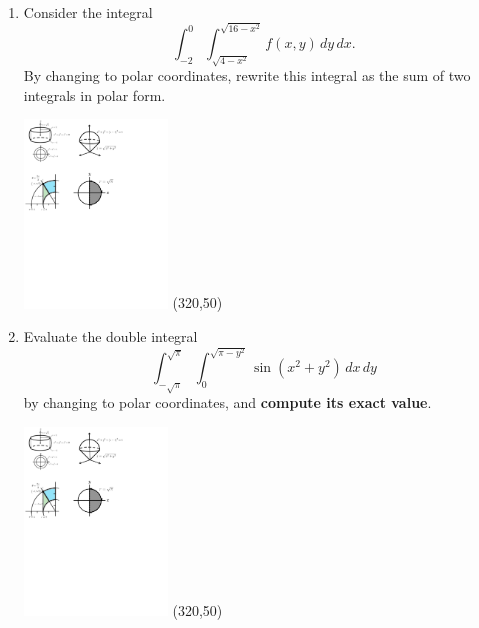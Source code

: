 \documentclass[12pt]{exam}
\begin{document}
\begin{enumerate} 

\item Consider the integral 
$$\int_{-2}^0\int_{\sqrt{4-x^2}}^{\sqrt{16-x^2}}f(x,y)\,dy\,dx.$$
By changing to polar coordinates, rewrite this integral as the sum of two integrals in polar form.
\begin{flushleft}
    \includegraphics[width=0.3\textwidth, trim=0.5cm 14.5cm 16.5cm 8cm,clip]{figs.pdf}\hfill 
\framebox(320,50){}
\end{flushleft}

\item Evaluate the double integral 
$$\int_{-\sqrt{\pi}}^{\sqrt{\pi}}\int_{0}^{\sqrt{\pi-y^2}}\sin(x^2+y^2)\,dx\,dy$$
by changing to polar coordinates, and \textbf{compute its exact value}.
\begin{flushleft}
    \includegraphics[width=0.3\textwidth, trim=7.5cm 15cm 8cm 8cm,clip]{figs.pdf}\hfill 
\framebox(320,50){}
\end{flushleft}

\newpage


\end{enumerate}
\end{document}
